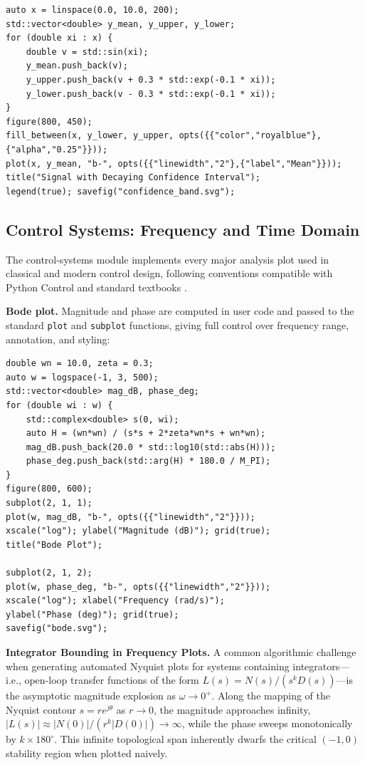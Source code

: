 \documentclass[preprint,12pt]{elsarticle}
\begin{document}
\begin{lstlisting}
auto x = linspace(0.0, 10.0, 200);
std::vector<double> y_mean, y_upper, y_lower;
for (double xi : x) {
    double v = std::sin(xi);
    y_mean.push_back(v);
    y_upper.push_back(v + 0.3 * std::exp(-0.1 * xi));
    y_lower.push_back(v - 0.3 * std::exp(-0.1 * xi));
}
figure(800, 450);
fill_between(x, y_lower, y_upper, opts({{"color","royalblue"},{"alpha","0.25"}}));
plot(x, y_mean, "b-", opts({{"linewidth","2"},{"label","Mean"}}));
title("Signal with Decaying Confidence Interval");
legend(true); savefig("confidence_band.svg");
\end{lstlisting}

\subsection{Control Systems: Frequency and Time Domain}
The control-systems module implements every major analysis plot used in classical and modern control design, following conventions compatible with Python Control \cite{Fuller2021} and standard textbooks \cite{Ogata2010, Franklin2019}.

\textbf{Bode plot.} Magnitude and phase are computed in user code and passed to the standard \texttt{plot} and \texttt{subplot} functions, giving full control over frequency range, annotation, and styling:

\begin{lstlisting}
double wn = 10.0, zeta = 0.3;
auto w = logspace(-1, 3, 500);
std::vector<double> mag_dB, phase_deg;
for (double wi : w) {
    std::complex<double> s(0, wi);
    auto H = (wn*wn) / (s*s + 2*zeta*wn*s + wn*wn);
    mag_dB.push_back(20.0 * std::log10(std::abs(H)));
    phase_deg.push_back(std::arg(H) * 180.0 / M_PI);
}
figure(800, 600);
subplot(2, 1, 1);
plot(w, mag_dB, "b-", opts({{"linewidth","2"}}));
xscale("log"); ylabel("Magnitude (dB)"); grid(true);
title("Bode Plot");

subplot(2, 1, 2);
plot(w, phase_deg, "b-", opts({{"linewidth","2"}}));
xscale("log"); xlabel("Frequency (rad/s)");
ylabel("Phase (deg)"); grid(true);
savefig("bode.svg");
\end{lstlisting}

\textbf{Integrator Bounding in Frequency Plots.} A common algorithmic challenge when generating automated Nyquist plots for systems containing integrators---i.e., open-loop transfer functions of the form $L(s) = N(s) / (s^k D(s))$---is the asymptotic magnitude explosion as $\omega \to 0^+$. Along the mapping of the Nyquist contour $s = r e^{j\theta}$ as $r \to 0$, the magnitude approaches infinity, $|L(s)| \approx |N(0)| / (r^k |D(0)|) \to \infty$, while the phase sweeps monotonically by $k \times 180^\circ$. This infinite topological span inherently dwarfs the critical $(-1, 0)$ stability region when plotted naively.
\end{document}
